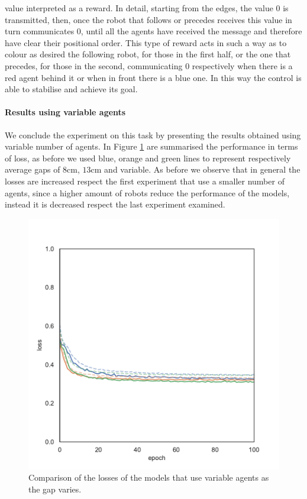 value interpreted as a reward. In detail, starting from the edges, the value 0 is 
transmitted, then, once the robot that follows or precedes receives this value in 
turn communicates 0, until all the agents have received the message and 
therefore have clear their positional order.
This type of reward acts in such a way as to colour as desired the following robot, 
for those in the first half, or the one that precedes, for those in the second, 
communicating 0 respectively when there is a red agent behind it or when in front 
there is a blue one. In this way the control is able to stabilise and achieve its goal.


\paragraph*{Results using variable agents}
We conclude the experiment on this task by presenting the results obtained using 
variable number of agents. In Figure \ref{fig:commlossnvart2} are summarised the 
performance in terms of loss, as before we used blue, orange and green lines to 
represent respectively average gaps of $8$\gls{cm}, $13$\gls{cm} and variable. 
As before we observe that in general the losses are increased respect the first 
experiment that use a smaller number of agents, since a higher amount of robots 
reduce the performance of the models, instead it is decreased respect the last 
experiment examined.
\begin{figure}[!htb]
	\centering
	\includegraphics[width=.47\textwidth]{contents/images/task2/loss-communication-Nvar}
	\caption[Comparison of the losses of the models that use variable 
	agents.]{Comparison of the losses of the models that use variable agents 
	as the gap varies.}
	\label{fig:commlossnvart2}
\end{figure}

